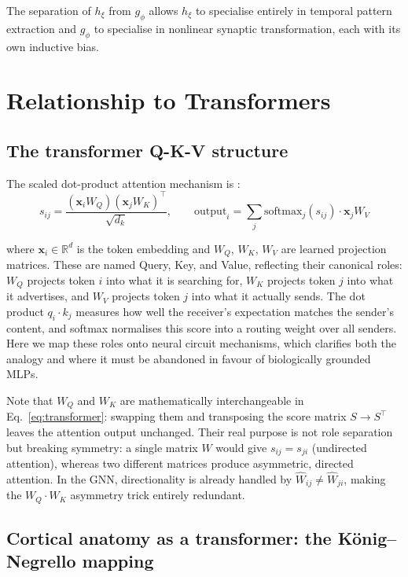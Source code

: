\documentclass[11pt]{article}
\begin{document}
The separation of $h_\xi$ from $g_\phi$ allows $h_\xi$ to specialise entirely
in temporal pattern extraction and $g_\phi$ to specialise in nonlinear synaptic
transformation, each with its own inductive bias.

\section{Relationship to Transformers}

\subsection*{The transformer Q-K-V structure}

The scaled dot-product attention mechanism is \citep{vaswani2017}:
\begin{equation}
s_{ij} = \frac{(\mathbf{x}_i W_Q)(\mathbf{x}_j W_K)^\top}{\sqrt{d_k}},
\qquad
\mathrm{output}_i = \sum_j \mathrm{softmax}_j(s_{ij})\cdot \mathbf{x}_j W_V
\label{eq:transformer}
\end{equation}

where $\mathbf{x}_i \in \mathbb{R}^d$ is the token embedding and $W_Q$,
$W_K$, $W_V$ are learned projection matrices.
These are named Query, Key, and Value, reflecting their canonical roles:
$W_Q$ projects token $i$ into what it is searching for, $W_K$ projects
token $j$ into what it advertises, and $W_V$ projects token $j$ into what
it actually sends. The dot product $q_i \cdot k_j$ measures how well the
receiver's expectation matches the sender's content, and softmax normalises
this score into a routing weight over all senders. Here we map these roles
onto neural circuit mechanisms, which clarifies both the analogy and where
it must be abandoned in favour of biologically grounded MLPs.

Note that $W_Q$ and $W_K$ are mathematically interchangeable in
Eq.~\eqref{eq:transformer}: swapping them and transposing the score matrix
$S \to S^\top$ leaves the attention output unchanged. Their real purpose is
not role separation but breaking symmetry: a single matrix $W$ would give
$s_{ij} = s_{ji}$ (undirected attention), whereas two different matrices
produce asymmetric, directed attention. In the GNN, directionality is
already handled by $\hat{W}_{ij} \neq \hat{W}_{ji}$, making the $W_Q
\cdot W_K$ asymmetry trick entirely redundant.

\subsection*{Cortical anatomy as a transformer: the K\"{o}nig--Negrello mapping}
\end{document}
